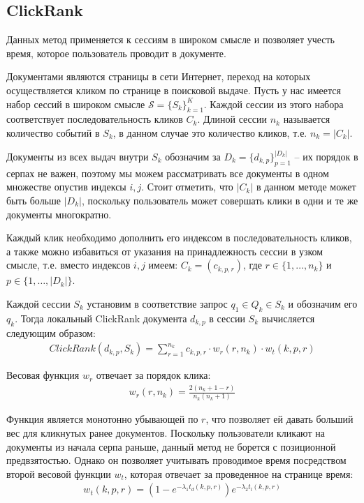 \documentclass[diploma]{nanolab2015}
\begin{document}
\subsection{ClickRank}
Данных метод применяется к сессиям в широком смысле и позволяет учесть время, которое пользователь проводит в документе.

Документами являются страницы в сети Интернет, переход на которых осуществляется кликом по странице в поисковой выдаче.
Пусть у нас имеется набор сессий в широком смысле $\mathcal{S} = \{S_k\}_{k=1}^K$. Каждой сессии из этого набора соответствует последовательность кликов $C_k$. Длиной сессии $n_k$ называется количество событий в $S_k$, в данном случае это количество кликов, т.е. $n_k = |C_k|$.

Документы из всех выдач внутри $S_k$ обозначим за $D_k = \{d_{k,p}\}_{p=1}^{|D_k|}$ -- их порядок в серпах не важен, поэтому мы можем рассматривать все документы в одном множестве опустив индексы $i,j$.
Стоит отметить, что $|C_k|$ в данном методе может быть больше $|D_k|$, поскольку пользователь может совершать клики в одни и те же документы многократно.

Каждый клик необходимо дополнить его индексом в последовательность кликов, а также можно избавиться от указания на принадлежность сессии в узком смысле, т.е. вместо индексов $i,j$ имеем: $C_k = (c_{k,p,r})$, где $r \in \{1, \dots, n_k\}$ и $p \in \{1, \dots, |D_k|\}$.

Каждой сессии $S_k$ установим в соответствие запрос $q_1 \in Q_k \in S_k$ и обозначим его $q_k$. Тогда локальный ClickRank \cite{clickrank} документа $d_{k,p}$ в сессии $S_k$ вычисляется следующим образом:
\begin{align}
  ClickRank(d_{k,p}, S_k) = \sum_{r=1}^{n_k} c_{k, p, r} \cdot w_r(r, n_k) \cdot w_t(k,p,r)
\end{align}

Весовая функция $w_r$ отвечает за порядок клика:
\begin{align}
  w_r(r, n_k) = \frac{2(n_k + 1 - r)}{n_k(n_k + 1)}
\end{align}

Функция является монотонно убывающей по $r$, что позволяет ей давать больший вес для кликнутых ранее документов. Поскольку пользователи кликают на документы из начала серпа раньше, данный метод не борется с позиционной предвзятостью. Однако он позволяет учитывать проводимое время посредством второй весовой функции $w_t$, которая отвечает за проведенное на странице время:
\begin{align}
  w_t(k,p,r) = (1 - e^{-\lambda_1 t_d(k,p,r)})e^{-\lambda_2 t_l(k,p,r)}
\end{align}
\end{document}
